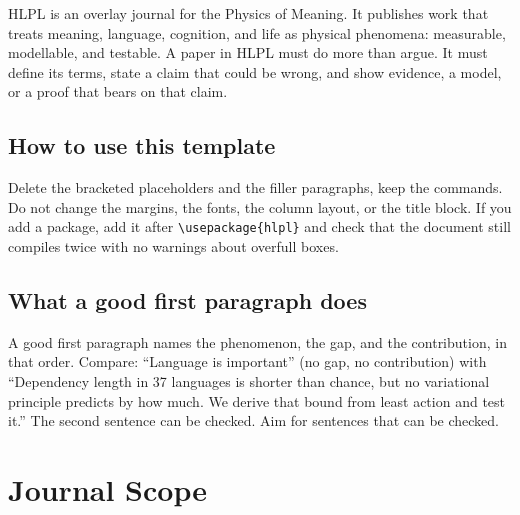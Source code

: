 \documentclass[9pt,a4paper,twocolumn]{article}
\begin{document}
HLPL is an overlay journal for the Physics of Meaning. It publishes work that treats meaning, language, cognition, and life as physical phenomena: measurable, modellable, and testable\citep{wang2023,douglas2023}. A paper in HLPL must do more than argue. It must define its terms, state a claim that could be wrong, and show evidence, a model, or a proof that bears on that claim.

\subsection{How to use this template}
Delete the bracketed placeholders and the filler paragraphs, keep the commands\citep{zahavy2026, techrxiv2025}. Do not change the margins, the fonts, the column layout, or the title block. If you add a package, add it after \verb|\usepackage{hlpl}| and check that the document still compiles twice with no warnings about overfull boxes.

\subsection{What a good first paragraph does}
A good first paragraph names the phenomenon, the gap, and the contribution, in that order. Compare: ``Language is important'' (no gap, no contribution) with ``Dependency length in 37 languages is shorter than chance, but no variational principle predicts by how much. We derive that bound from least action and test it.'' The second sentence can be checked. Aim for sentences that can be checked.

\section{Journal Scope}
\label{sec:scope}
\end{document}
